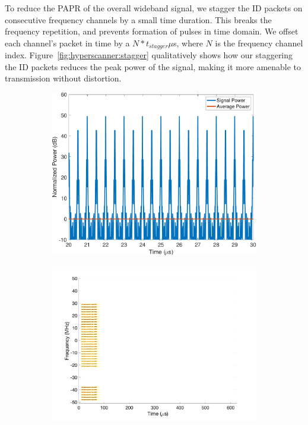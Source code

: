 To reduce the PAPR of the overall wideband signal, we stagger the ID packets on consecutive frequency channels by a small time duration. 
%
This breaks the frequency repetition, and prevents formation of pulses in time domain.
%
We offset each channel's packet in time by a $N*t_{stagger} \mu$s, where $N$ is the frequency channel index.
%
Figure~\ref{fig:hyperscanner:stagger} qualitatively shows how our staggering the ID packets reduces the peak power of the signal, making it more amenable to transmission without distortion.
%
\begin{figure}[!h]
    \centering
    \begin{subfigure}{0.48\textwidth}
        \includegraphics[width=\textwidth]{hyperscanner/plots/power_single_bt.pdf}
        \caption{}
    \end{subfigure}
    \hfill
    \begin{subfigure}{0.48\textwidth}
        \includegraphics[width=\textwidth]{hyperscanner/plots/stft_single_bt2.pdf}

\end{subfigure}
\end{figure}

